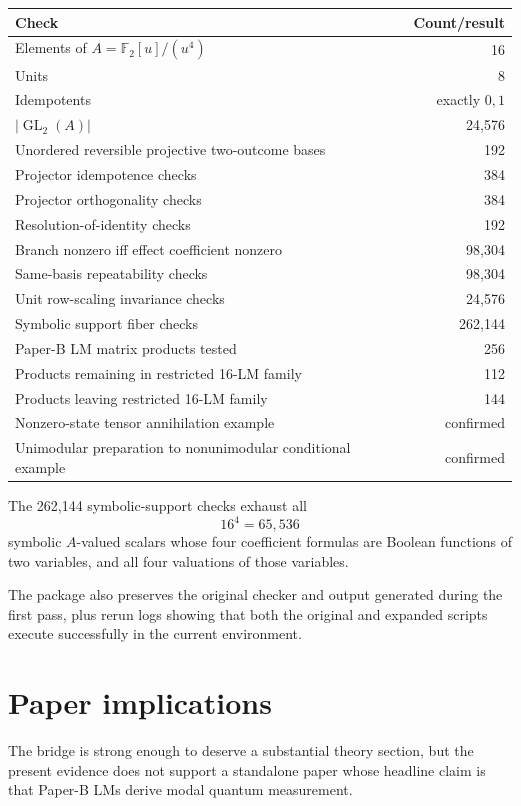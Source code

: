 \documentclass[11pt]{article}
\theoremstyle{definition}
\newcommand{\F}{\mathbb{F}}
\newcommand{\GL}{\operatorname{GL}}
\begin{document}
\begin{longtable}{p{}r}
\toprule
\textbf{Check} & \textbf{Count/result} \\
\midrule
\endhead
Elements of \(A=\F_2[u]/(u^4)\) & 16\\
Units & 8\\
Idempotents & exactly \(0,1\)\\
\(|\GL_2(A)|\) & 24,576\\
Unordered reversible projective two-outcome bases & 192\\
Projector idempotence checks & 384\\
Projector orthogonality checks & 384\\
Resolution-of-identity checks & 192\\
Branch nonzero iff effect coefficient nonzero & 98,304\\
Same-basis repeatability checks & 98,304\\
Unit row-scaling invariance checks & 24,576\\
Symbolic support fiber checks & 262,144\\
Paper-B LM matrix products tested & 256\\
Products remaining in restricted 16-LM family & 112\\
Products leaving restricted 16-LM family & 144\\
Nonzero-state tensor annihilation example & confirmed\\
Unimodular preparation to nonunimodular conditional example & confirmed\\
\bottomrule
\end{longtable}

The 262,144 symbolic-support checks exhaust all
\[
16^4=65,536
\]
symbolic \(A\)-valued scalars whose four coefficient formulas are Boolean functions of two variables,
and all four valuations of those variables.

The package also preserves the original checker and output generated during the first pass, plus
rerun logs showing that both the original and expanded scripts execute successfully in the current
environment.

\section{Paper implications}

The bridge is strong enough to deserve a substantial theory section, but the present evidence does
not support a standalone paper whose headline claim is that Paper-B LMs derive modal quantum
measurement.
\end{document}
